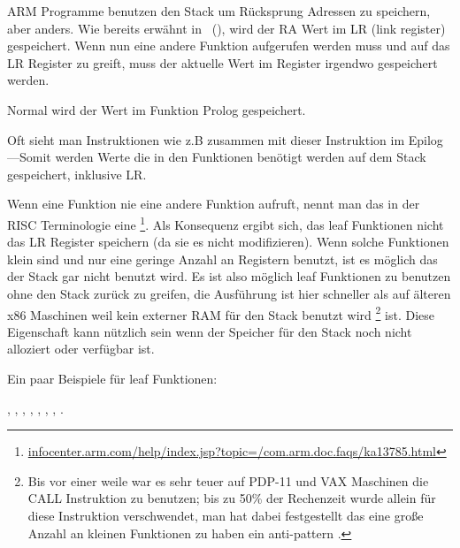 

ARM Programme benutzen den Stack um Rücksprung Adressen zu speichern, aber anders.
Wie bereits erwähnt in \q{\HelloWorldSectionName}~(),
wird der \ac{RA} Wert im \ac{LR} (\gls{link register}) gespeichert.
Wenn nun eine andere Funktion aufgerufen werden muss und auf das \ac{LR} Register 
zu greift, muss der aktuelle Wert im Register irgendwo gespeichert werden.

Normal wird der Wert im Funktion Prolog gespeichert.


Oft sieht man Instruktionen wie z.B  zusammen mit dieser Instruktion im 
Epilog ---Somit werden Werte die in den Funktionen benötigt werden auf dem 
Stack gespeichert, inklusive \ac{LR}.

Wenn eine Funktion nie eine andere Funktion aufruft, nennt man das in der \ac{RISC} Terminologie eine
\footnote{\href{http://go.yurichev.com/17064}{infocenter.arm.com/help/index.jsp?topic=/com.arm.doc.faqs/ka13785.html}}.  %
Als Konsequenz ergibt sich, das leaf Funktionen nicht das \ac{LR} Register speichern (da sie es nicht modifizieren).
Wenn solche Funktionen klein sind und nur eine geringe Anzahl an Registern benutzt, ist es möglich das der Stack
gar nicht benutzt wird. Es ist also möglich leaf Funktionen zu benutzen ohne den Stack zurück zu greifen, die Ausführung
ist hier schneller als auf älteren x86 Maschinen weil kein externer RAM für den Stack benutzt wird 
\footnote{Bis vor einer weile war es sehr teuer auf PDP-11 und VAX Maschinen die CALL Instruktion zu benutzen; bis zu 50\%
der Rechenzeit wurde allein für diese Instruktion verschwendet, man hat dabei festgestellt das eine große Anzahl an kleinen
Funktionen zu haben ein \gls{anti-pattern} .} ist.
Diese Eigenschaft kann nützlich sein wenn der Speicher für den Stack noch nicht alloziert oder verfügbar ist.

Ein paar Beispiele für leaf Funktionen:

, , 
, , ,
, , .

